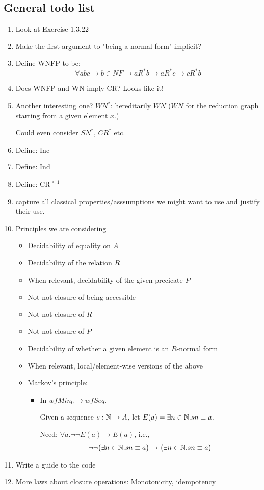 \documentclass{scrartcl}
\begin{document}
\subsection{General todo list}
\begin{enumerate}
  \item Look at Exercise 1.3.22
  \item  Make the first argument to "being a normal form" implicit?
  \item Define WNFP to be:
  \[\forall a b c \to b \in NF \to a R^* b \to a R^* c \to c R^* b \]
  \item Does WNFP and WN imply CR?  Looks like it!
  \item  Another interesting one? $WN^*$: hereditarily $WN$ ($WN$ for the reduction graph starting from a given element $x$.)

  Could even consider $SN^*$, $CR^*$ etc.
  \item Define: Inc
  \item Define: Ind
  \item Define: $\mathrm{CR}^{\le 1}$
  \item capture all classical properties/asssumptions we might want to use and justify their use.
  \item Principles we are considering
  \begin{itemize}
    \item Decidability of equality on $A$
    \item Decidability of the relation $R$
    \item When relevant, decidability of the given precicate $P$
    \item Not-not-closure of being accessible
    \item Not-not-closure of $R$
    \item Not-not-closure of $P$
    \item Decidability of whether a given element is an $R$-normal form
    \item When relevant, local/element-wise versions of the above
    \item Markov's principle:
    \begin{itemize}
      \item In $wfMin_0 \to wfSeq$.

      Given a sequence $s : \mathbb{N} \to A$, let $E(a) = \exists n \in \mathbb{N}. s n \equiv a$.

      Need: $\forall a. \lnot\lnot E(a) \to E(a)$, i.e.,
      \[\lnot\lnot \big(\exists n \in \mathbb{N}. s n \equiv a\big)
            \to \big(\exists n \in \mathbb{N}. s n \equiv a\big)\]

    \end{itemize}
  \end{itemize}
  \item Write a guide to the code
  \item More laws about closure operations: Monotonicity, idempotency
\end{enumerate}
\end{document}

